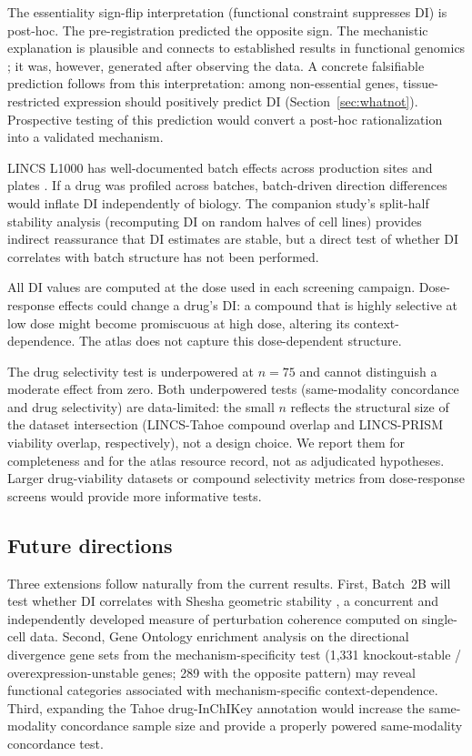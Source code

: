 \documentclass[11pt]{article}
\begin{document}
The essentiality sign-flip interpretation (functional constraint
suppresses DI) is post-hoc.  The pre-registration predicted the
opposite sign.  The mechanistic explanation is plausible and connects to
established results in functional genomics
\citep{funk2022phenotypic, ramezani2025periscope}; it was, however,
generated after observing the data.  A concrete falsifiable prediction
follows from this interpretation: among non-essential genes,
tissue-restricted expression should positively predict DI
(Section~\ref{sec:whatnot}).  Prospective testing of this prediction
would convert a post-hoc rationalization into a validated mechanism.

LINCS L1000 has well-documented batch effects across production sites
and plates \citep{subramanian2017next}.  If a drug was profiled across
batches, batch-driven direction differences would inflate DI
independently of biology.  The companion study's split-half stability
analysis (recomputing DI on random halves of cell lines) provides
indirect reassurance that DI estimates are stable, but a direct test of
whether DI correlates with batch structure has not been performed.

All DI values are computed at the dose used in each screening campaign.
Dose-response effects could change a drug's DI: a compound that is
highly selective at low dose might become promiscuous at high dose,
altering its context-dependence.  The atlas does not capture this
dose-dependent structure.

The drug selectivity test is underpowered at $n = 75$ and cannot
distinguish a moderate effect from zero.  Both underpowered tests
(same-modality concordance and drug selectivity) are data-limited: the small $n$ reflects the structural size of
the dataset intersection (LINCS-Tahoe compound overlap and LINCS-PRISM
viability overlap, respectively), not a design choice.  We report them
for completeness and for the atlas resource record, not as adjudicated
hypotheses.  Larger drug-viability datasets or compound selectivity
metrics from dose-response screens would provide more informative tests.

\subsection{Future directions}

Three extensions follow naturally from the current results.  First,
Batch~2B will test whether DI correlates with Shesha geometric
stability \citep{raju2026a, raju2026b}, a concurrent and independently
developed measure of perturbation coherence computed on single-cell
data.  Second, Gene Ontology enrichment analysis on the directional
divergence gene sets from the mechanism-specificity test (1{,}331 knockout-stable /
overexpression-unstable genes; 289 with the opposite pattern) may reveal
functional categories associated with mechanism-specific
context-dependence.  Third, expanding the Tahoe drug-InChIKey
annotation would increase the same-modality concordance sample size and provide a properly
powered same-modality concordance test.
\end{document}
